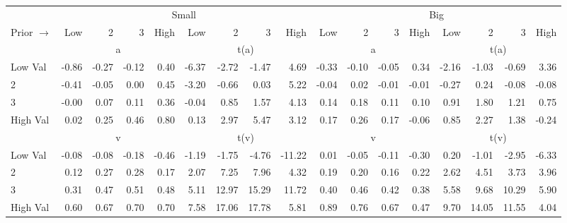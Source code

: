 

\begin{tabular}{lrrrrrrrrrrrrrrrr}
  \toprule
    & \multicolumn{8}{c}{Small} & \multicolumn{8}{c}{Big} \\
      \cmidrule(r){2-9} \cmidrule(r){10-17}
    Prior $\rightarrow$ & Low & 2 & 3 & High & Low & 2 & 3 & High & Low & 2 & 3 & High & Low & 2 & 3 & High \\ 
  \midrule

  
    
      & \multicolumn{4}{c}{a} & \multicolumn{4}{c}{t(a)}
    
      & \multicolumn{4}{c}{a} & \multicolumn{4}{c}{t(a)}
    
    \\
      \cmidrule(r){2-5} \cmidrule(r){6-9} \cmidrule(r){10-13} \cmidrule(r){14-17}

    Low Val   & -0.86  & -0.27  & -0.12  & 0.40  & -6.37  & -2.72  & -1.47  & 4.69  & -0.33  & -0.10  & -0.05  & 0.34  & -2.16  & -1.03  & -0.69  & 3.36  \\
           2  & -0.41  & -0.05  & 0.00  & 0.45  & -3.20  & -0.66  & 0.03  & 5.22  & -0.04  & 0.02  & -0.01  & -0.01  & -0.27  & 0.24  & -0.08  & -0.08  \\
           3  & -0.00  & 0.07  & 0.11  & 0.36  & -0.04  & 0.85  & 1.57  & 4.13  & 0.14  & 0.18  & 0.11  & 0.10  & 0.91  & 1.80  & 1.21  & 0.75  \\
    High Val  & 0.02  & 0.25  & 0.46  & 0.80  & 0.13  & 2.97  & 5.47  & 3.12  & 0.17  & 0.26  & 0.17  & -0.06  & 0.85  & 2.27  & 1.38  & -0.24  \\

  
    
      & \multicolumn{4}{c}{v} & \multicolumn{4}{c}{t(v)}
    
      & \multicolumn{4}{c}{v} & \multicolumn{4}{c}{t(v)}
    
    \\
      \cmidrule(r){2-5} \cmidrule(r){6-9} \cmidrule(r){10-13} \cmidrule(r){14-17}

    Low Val   & -0.08  & -0.08  & -0.18  & -0.46  & -1.19  & -1.75  & -4.76  & -11.22  & 0.01  & -0.05  & -0.11  & -0.30  & 0.20  & -1.01  & -2.95  & -6.33  \\
           2  & 0.12  & 0.27  & 0.28  & 0.17  & 2.07  & 7.25  & 7.96  & 4.32  & 0.19  & 0.20  & 0.16  & 0.22  & 2.62  & 4.51  & 3.73  & 3.96  \\
           3  & 0.31  & 0.47  & 0.51  & 0.48  & 5.11  & 12.97  & 15.29  & 11.72  & 0.40  & 0.46  & 0.42  & 0.38  & 5.58  & 9.68  & 10.29  & 5.90  \\
    High Val  & 0.60  & 0.67  & 0.70  & 0.70  & 7.58  & 17.06  & 17.78  & 5.81  & 0.89  & 0.76  & 0.67  & 0.47  & 9.70  & 14.05  & 11.55  & 4.04  \\


\end{tabular}
